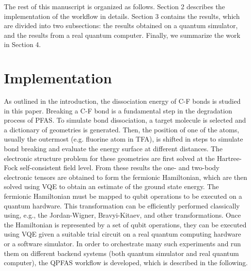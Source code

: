 \documentclass[journal,onecolumn]{IEEEtran}
\begin{document}
The rest of this manuscript is organized as follows.
Section 2 describes the implementation of the workflow in details.
Section 3 contains the results, which are divided into two subsections: the results obtained on a quantum simulator, and the results from a real quantum computer. 
Finally, we summarize the work in Section 4.    

\section{Implementation}
\label{sec:workflow_and_implementation}
As outlined in the introduction, the dissociation energy of C-F bonds is studied in this paper.
Breaking a C-F bond is a fundamental step in the degradation process of PFAS.
%
To simulate bond dissociation, a target molecule is selected and a dictionary of geometries is generated.
Then, the position of one of the atoms, usually the outermost (e.g. fluorine atom in TFA), is shifted in steps to simulate bond breaking and evaluate the energy surface at different distances.
%
The electronic structure problem for these geometries are first solved at the Hartree-Fock self-consistent field level. 
From these results the one- and two-body electronic tensors are obtained to form the fermionic Hamiltonian, which are then solved using VQE to obtain an estimate of the ground state energy.
The fermionic Hamiltonian must be mapped to qubit operations to be executed on a quantum hardware. 
This transformation can be efficiently performed classically using, e.g., the Jordan-Wigner, Bravyi-Kitaev, and other transformations. 
Once the Hamiltonian is represented by a set of qubit operations, they can be executed using VQE given a suitable trial circuit on a real quantum computing hardware or a software simulator.
%
In order to orchestrate many such experiments and run them on different backend systems (both quantum simulator and real quantum computer), the QPFAS workflow is developed, which is described in the following.

\end{document}
